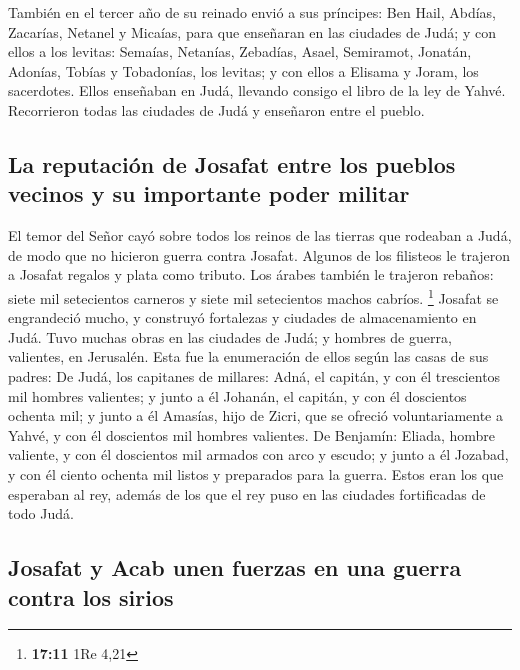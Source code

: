 También en el tercer año de su reinado envió a sus
príncipes: Ben Hail, Abdías, Zacarías, Netanel y Micaías, para que
enseñaran en las ciudades de Judá;  y con ellos a los
levitas: Semaías, Netanías, Zebadías, Asael, Semiramot, Jonatán,
Adonías, Tobías y Tobadonías, los levitas; y con ellos a Elisama y
Joram, los sacerdotes.  Ellos enseñaban en Judá, llevando
consigo el libro de la ley de Yahvé. Recorrieron todas las ciudades de
Judá y enseñaron entre el pueblo.

\hypertarget{la-reputaciuxf3n-de-josafat-entre-los-pueblos-vecinos-y-su-importante-poder-militar}{%
\subsection{La reputación de Josafat entre los pueblos vecinos y su
importante poder
militar}\label{la-reputaciuxf3n-de-josafat-entre-los-pueblos-vecinos-y-su-importante-poder-militar}}

 El temor del Señor cayó sobre todos los reinos de las
tierras que rodeaban a Judá, de modo que no hicieron guerra contra
Josafat.  Algunos de los filisteos le trajeron a Josafat
regalos y plata como tributo. Los árabes también le trajeron rebaños:
siete mil setecientos carneros y siete mil setecientos machos cabríos.
\footnote{\textbf{17:11} 1Re 4,21}  Josafat se
engrandeció mucho, y construyó fortalezas y ciudades de almacenamiento
en Judá.  Tuvo muchas obras en las ciudades de Judá; y
hombres de guerra, valientes, en Jerusalén.  Esta fue la
enumeración de ellos según las casas de sus padres: De Judá, los
capitanes de millares: Adná, el capitán, y con él trescientos mil
hombres valientes;  y junto a él Johanán, el capitán, y
con él doscientos ochenta mil;  y junto a él Amasías,
hijo de Zicri, que se ofreció voluntariamente a Yahvé, y con él
doscientos mil hombres valientes.  De Benjamín: Eliada,
hombre valiente, y con él doscientos mil armados con arco y escudo;
 y junto a él Jozabad, y con él ciento ochenta mil listos
y preparados para la guerra.  Estos eran los que
esperaban al rey, además de los que el rey puso en las ciudades
fortificadas de todo Judá.

\hypertarget{josafat-y-acab-unen-fuerzas-en-una-guerra-contra-los-sirios}{%
\subsection{Josafat y Acab unen fuerzas en una guerra contra los
sirios}\label{josafat-y-acab-unen-fuerzas-en-una-guerra-contra-los-sirios}}

